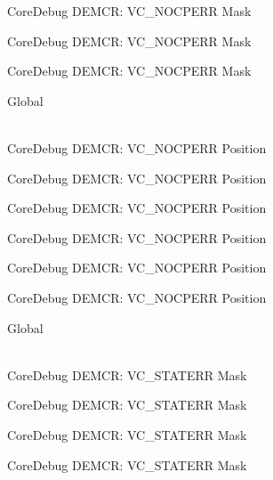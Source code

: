 \begin{DoxyRefList}
\label{deprecated__deprecated000428}%
%
Core\+Debug DEMCR\+: VC\+\_\+\+NOCPERR Mask 

\label{deprecated__deprecated000517}%
%
Core\+Debug DEMCR\+: VC\+\_\+\+NOCPERR Mask 

\label{deprecated__deprecated000619}%
%
Core\+Debug DEMCR\+: VC\+\_\+\+NOCPERR Mask  
\item[{\parbox[t]{\linewidth}{Global \doxylink{group___c_m_s_i_s___core_debug_gac9d13eb2add61f610d5ced1f7ad2adf8}{Core\+Debug\+\_\+\+DEMCR\+\_\+\+VC\+\_\+\+NOCPERR\+\_\+\+Pos} }}]\hfill \\
\label{deprecated__deprecated000065}%
%
Core\+Debug DEMCR\+: VC\+\_\+\+NOCPERR Position 

\label{deprecated__deprecated000209}%
%
Core\+Debug DEMCR\+: VC\+\_\+\+NOCPERR Position 

\label{deprecated__deprecated000351}%
%
Core\+Debug DEMCR\+: VC\+\_\+\+NOCPERR Position 

\label{deprecated__deprecated000427}%
%
Core\+Debug DEMCR\+: VC\+\_\+\+NOCPERR Position 

\label{deprecated__deprecated000516}%
%
Core\+Debug DEMCR\+: VC\+\_\+\+NOCPERR Position 

\label{deprecated__deprecated000618}%
%
Core\+Debug DEMCR\+: VC\+\_\+\+NOCPERR Position  
\item[{\parbox[t]{\linewidth}{Global \doxylink{group___c_m_s_i_s___core_debug_gaa38b947d77672c48bba1280c0a642e19}{Core\+Debug\+\_\+\+DEMCR\+\_\+\+VC\+\_\+\+STATERR\+\_\+\+Msk} }}]\hfill \\
\label{deprecated__deprecated000062}%
%
Core\+Debug DEMCR\+: VC\+\_\+\+STATERR Mask 

\label{deprecated__deprecated000206}%
%
Core\+Debug DEMCR\+: VC\+\_\+\+STATERR Mask 

\label{deprecated__deprecated000348}%
%
Core\+Debug DEMCR\+: VC\+\_\+\+STATERR Mask 

\label{deprecated__deprecated000424}%
%
Core\+Debug DEMCR\+: VC\+\_\+\+STATERR Mask 


\end{DoxyRefList}
